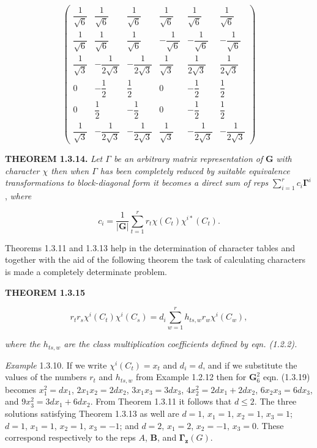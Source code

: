 \documentclass[11pt,a4paper,twoside,openright]{book}
\begin{document}
\begin{equation*}
\left( \begin{array}{cccccc} \dfrac{1}{\sqrt{6}} & \dfrac{1}{\sqrt{6}} & \dfrac{1}{\sqrt{6}} & \dfrac{1}{\sqrt{6}} & \dfrac{1}{\sqrt{6}} & \dfrac{1}{\sqrt{6}} \\[2mm] \dfrac{1}{\sqrt{6}} & \dfrac{1}{\sqrt{6}} & \dfrac{1}{\sqrt{6}} & -\dfrac{1}{\sqrt{6}} & -\dfrac{1}{\sqrt{6}} & -\dfrac{1}{\sqrt{6}} \\[2mm] \dfrac{1}{\sqrt{3}} & -\dfrac{1}{2\sqrt{3}} & -\dfrac{1}{2\sqrt{3}} & \dfrac{1}{\sqrt{3}} & \dfrac{1}{2\sqrt{3}} & \dfrac{1}{2\sqrt{3}} \\[2mm] 0 & -\dfrac{1}{2} & \dfrac{1}{2} & 0 & -\dfrac{1}{2} & \dfrac{1}{2} \\[2mm] 0 & \dfrac{1}{2} & -\dfrac{1}{2} & 0 & -\dfrac{1}{2} & \dfrac{1}{2} \\[2mm] \dfrac{1}{\sqrt{3}} & -\dfrac{1}{2\sqrt{3}} & -\dfrac{1}{2\sqrt{3}} & \dfrac{1}{\sqrt{3}} & -\dfrac{1}{2\sqrt{3}} & -\dfrac{1}{2\sqrt{3}} \end{array} \right)
\end{equation*}

\textbf{THEOREM 1.3.14.} \textit{Let $\Gamma$ be an arbitrary matrix representation of} $\mathbf{G}$ \textit{with character $\chi$ then when $\Gamma$ has been completely reduced by suitable equivalence transformations to block-diagonal form it becomes a direct sum of reps} $\sum_{i=1}^{r} c_{i}\boldsymbol{\Gamma}^{i}$, \textit{where}

\begin{equation*}
c_{i} = \frac{1}{|\mathbf{G}|}\sum_{t=1}^{r} r_{t}\chi(C_{t})\chi^{i*}(C_{t}). \tag{1.3.18}
\end{equation*}

Theorems 1.3.11 and 1.3.13 help in the determination of character tables and together with the aid of the following theorem the task of calculating characters is made a completely determinate problem.

\textbf{THEOREM 1.3.15}

\begin{equation*}
r_{t}r_{s}\chi^{i}(C_{t})\chi^{i}(C_{s}) = d_{i}\sum_{w=1}^{r} h_{ts,w}r_{w}\chi^{i}(C_{w}), \tag{1.3.19}
\end{equation*}

\textit{where the $h_{ts,w}$ are the class multiplication coefficients defined by eqn. (1.2.2).}

\textit{Example} 1.3.10. If we write $\chi^{i}(C_{t}) = x_{t}$ and $d_{i} = d$, and if we substitute the values of the numbers $r_{t}$ and $h_{ts,w}$ from Example 1.2.12 then for $\mathbf{G}_6^2$ eqn. (1.3.19) becomes $x_{1}^{2} = dx_{1}$, $2x_{1}x_{2} = 2dx_{2}$, $3x_{1}x_{3} = 3dx_{3}$, $4x_{2}^{2} = 2dx_{1} + 2dx_{2}$, $6x_{2}x_{3} = 6dx_{3}$, and $9x_{3}^{2} = 3dx_{1} + 6dx_{2}$. From Theorem 1.3.11 it follows that $d \leqslant 2$. The three solutions satisfying Theorem 1.3.13 as well are $d = 1$, $x_{1} = 1$, $x_{2} = 1$, $x_{3} = 1$; $d = 1$, $x_{1} = 1$, $x_{2} = 1$, $x_{3} = -1$; and $d = 2$, $x_{1} = 2$, $x_{2} = -1$, $x_{3} = 0$. These correspond respectively to the reps $A$, $\mathbf{B}$, and $\boldsymbol{\Gamma}_{\mathbf{z}}(G)$.
\end{document}

